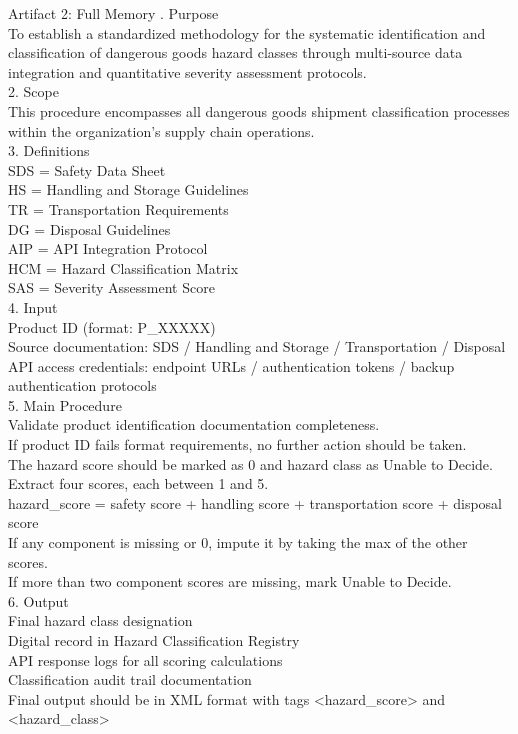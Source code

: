 \begin{CaseTraceBox}{Artifact 2: Full Memory}
\small{}. Purpose \\
To establish a standardized methodology for the systematic identification and classification of dangerous goods hazard classes through multi-source data integration and quantitative severity assessment protocols. \\
2. Scope \\
This procedure encompasses all dangerous goods shipment classification processes within the organization's supply chain operations. \\
3. Definitions \\
SDS = Safety Data Sheet \\
HS = Handling and Storage Guidelines \\
TR = Transportation Requirements \\
DG = Disposal Guidelines \\
AIP = API Integration Protocol \\
HCM = Hazard Classification Matrix \\
SAS = Severity Assessment Score \\
4. Input \\
Product ID (format: P\_XXXXX) \\
Source documentation: SDS / Handling and Storage / Transportation / Disposal \\
API access credentials: endpoint URLs / authentication tokens / backup authentication protocols \\
5. Main Procedure \\
Validate product identification documentation completeness. \\
If product ID fails format requirements, no further action should be taken. \\
The hazard score should be marked as 0 and hazard class as Unable to Decide. \\
Extract four scores, each between 1 and 5. \\
hazard\_score = safety score + handling score + transportation score + disposal score \\
If any component is missing or 0, impute it by taking the max of the other scores. \\
If more than two component scores are missing, mark Unable to Decide. \\
6. Output \\
Final hazard class designation \\
Digital record in Hazard Classification Registry \\
API response logs for all scoring calculations \\
Classification audit trail documentation \\
Final output should be in XML format with tags \textless{}hazard\_score\textgreater{} and \textless{}hazard\_class\textgreater{}
\end{CaseTraceBox}

